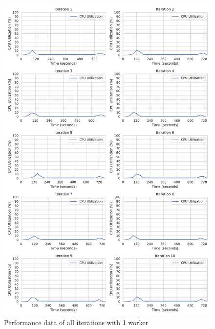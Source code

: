 \begin{figure}[h]
\centering
\includegraphics[scale=0.4]{images/07_evaluation/regression/1_worker_cpu_performance}
\caption{Performance data of all iterations with 1 worker}
\label{fig:appendix_eval_regression_static1}
\end{figure}

